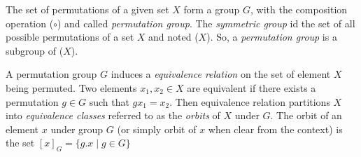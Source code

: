 The set of permutations of a given set $X$ form a group $G$,
with the composition operation ($\circ$) and called \emph{permutation group}.
The \emph{symmetric group} id the set of all possible permutations of a set $X$ and noted \Group($X$).
So, a \emph{permutation group} is a subgroup of \Group($X$). 


A permutation group $G$ induces a \emph{equivalence relation} on the set of element $X$ being
permuted. Two elements $x_1, x_2 \in X$ are equivalent if there exists a permutation $g \in G$ such that
$g x_1 = x_2$. Then equivalence relation partitions $X$ into \emph{equivalence classes} referred to
as the \emph{orbits} of $X$ under $G$. The orbit of an element $x$ under group $G$ (or simply orbit of $x$ when clear
from the context) is the set $[x]_G = \{g.x \mid g \in G\}$




